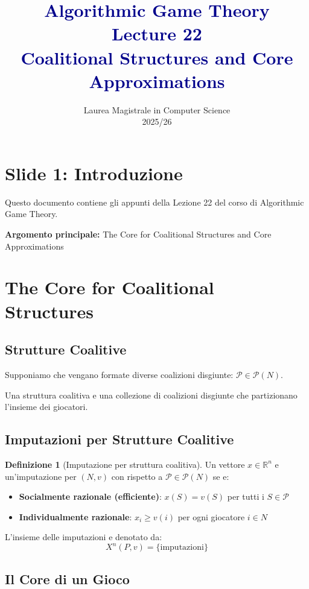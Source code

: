 \documentclass[12pt,a4paper]{article}
\title{\textcolor{darkblue}{\Large Algorithmic Game Theory \\ Lecture 22 \\ Coalitional Structures and Core Approximations}}
\author{Laurea Magistrale in Computer Science \\ 2025/26}
\date{}
\theoremstyle{definition}
\newtheorem{definition}{Definizione}[section]
\begin{document}
\maketitle

\section*{Slide 1: Introduzione}

Questo documento contiene gli appunti della Lezione 22 del corso di Algorithmic Game Theory.

\textbf{Argomento principale:} The Core for Coalitional Structures and Core Approximations

\newpage

\section{The Core for Coalitional Structures}

\subsection*{Strutture Coalitive}

Supponiamo che vengano formate diverse coalizioni disgiunte: $\mathcal{P} \in \mathcal{P}(N)$.

Una struttura coalitiva e una collezione di coalizioni disgiunte che partizionano l'insieme dei giocatori.

\subsection*{Imputazioni per Strutture Coalitive}

\begin{definition}[Imputazione per struttura coalitiva]
Un vettore $x \in \mathbb{R}^n$ e un'imputazione per $(N, v)$ con rispetto a $\mathcal{P} \in \mathcal{P}(N)$ se e:
\begin{itemize}
    \item \textbf{Socialmente razionale (efficiente)}: $x(S) = v(S)$ per tutti i $S \in \mathcal{P}$
    \item \textbf{Individualmente razionale}: $x_i \geq v(i)$ per ogni giocatore $i \in N$
\end{itemize}
\end{definition}

L'insieme delle imputazioni e denotato da:
\[
X^n(P, v) = \{\text{imputazioni}\}
\]

\subsection*{Il Core di un Gioco}
\end{document}
